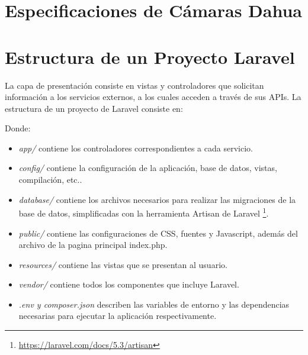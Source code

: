 \newpage
\appendix
\chapter{Especificaciones de Cámaras Dahua}
\label{appendix:dahua}

\newpage
\appendix
\chapter{Estructura de un Proyecto Laravel}
La capa de presentación consiste en vistas y controladores que solicitan información a los servicios externos, a los cuales acceden a través de sus APIs.
\clearpage
La estructura de un proyecto de Laravel consiste en:

\vspace{0.5cm}
{
}
Donde:

\begin{itemize}
\item \textit{app/} contiene los controladores correspondientes a cada servicio.
\item \textit{config/} contiene la configuración de la aplicación, base de datos, vistas, compilación, etc..
\item \textit{database/} contiene los archivos necesarios para realizar las migraciones de la base de datos, simplificadas con la herramienta Artisan de Laravel \footnote{\url{https://laravel.com/docs/5.3/artisan}}.
\item \textit{public/} contiene las configuraciones de CSS, fuentes y Javascript, además del archivo de la pagina principal index.php.
\item \textit{resources/} contiene las vistas que se presentan al usuario.
\item \textit{vendor/} contiene todos los componentes que incluye Laravel.
\item \textit{.env y composer.json} describen las variables de entorno y las dependencias necesarias para ejecutar la aplicación respectivamente.

\end{itemize}

